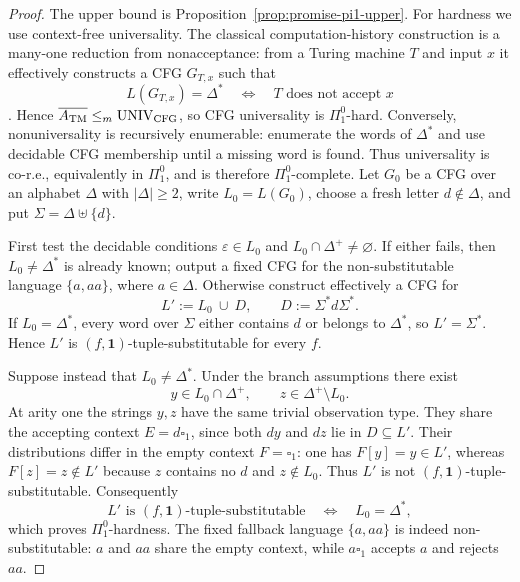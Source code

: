 \documentclass[11pt,a4paper]{article}
\numberwithin{equation}{section}
\theoremstyle{plain}
\theoremstyle{definition}
\theoremstyle{remark}
\newcommand{\blank}{\square}
\newcommand{\eps}{\varepsilon}
\begin{document}
\begin{proof}
The upper bound is Proposition~\ref{prop:promise-pi1-upper}.  For hardness we
use context-free universality.  The classical computation-history construction
is a many-one reduction from nonacceptance: from a Turing machine $T$ and input
$x$ it effectively constructs a CFG $G_{T,x}$ such that
\[
  L(G_{T,x})=\Delta^*
  \quad\Longleftrightarrow\quad
  T\text{ does not accept }x
\]
\cite[p.~281]{HopcroftUllman1979}.  Hence
$\overline{A_{\rm TM}}\le_m\mathrm{UNIV}_{\rm CFG}$, so CFG universality is
$\Pi^0_1$-hard.  Conversely, nonuniversality is recursively enumerable:
enumerate the words of $\Delta^*$ and use decidable CFG membership until a
missing word is found.  Thus universality is co-r.e., equivalently in
$\Pi^0_1$, and is therefore $\Pi^0_1$-complete.  Let $G_0$ be a CFG over
an alphabet $\Delta$ with
$|\Delta|\ge2$, write $L_0=L(G_0)$, choose a fresh letter
$d\notin\Delta$, and put $\Sigma=\Delta\uplus\{d\}$.

First test the decidable conditions $\eps\in L_0$ and
$L_0\cap\Delta^+\ne\varnothing$.  If either fails, then $L_0\ne\Delta^*$ is
already known; output a fixed CFG for the non-substitutable language
$\{a,aa\}$, where $a\in\Delta$.  Otherwise construct effectively a CFG for
\[
 L' := L_0\ \cup\ D,
 \qquad
 D:=\Sigma^*d\Sigma^*.
\]
If $L_0=\Delta^*$, every word over $\Sigma$ either contains $d$ or belongs to
$\Delta^*$, so $L'=\Sigma^*$.  Hence $L'$ is $(f,\mathbf1)$-tuple-substitutable
for every $f$.

Suppose instead that $L_0\ne\Delta^*$.  Under the branch assumptions there
exist
\[
 y\in L_0\cap\Delta^+,
 \qquad
 z\in\Delta^+\setminus L_0.
\]
At arity one the strings $y,z$ have the same trivial observation type.  They
share the accepting context $E=d\blank_1$, since both $dy$ and $dz$ lie in
$D\subseteq L'$.  Their distributions differ in the empty context
$F=\blank_1$: one has $F[y]=y\in L'$, whereas $F[z]=z\notin L'$ because $z$
contains no $d$ and $z\notin L_0$.  Thus $L'$ is not
$(f,\mathbf1)$-tuple-substitutable.  Consequently
\[
 L'\text{ is }(f,\mathbf1)\text{-tuple-substitutable}
 \quad\Longleftrightarrow\quad
 L_0=\Delta^*,
\]
which proves $\Pi^0_1$-hardness.  The fixed fallback language $\{a,aa\}$ is
indeed non-substitutable: $a$ and $aa$ share the empty context, while
$a\blank_1$ accepts $a$ and rejects $aa$.
\end{proof}
\end{document}
